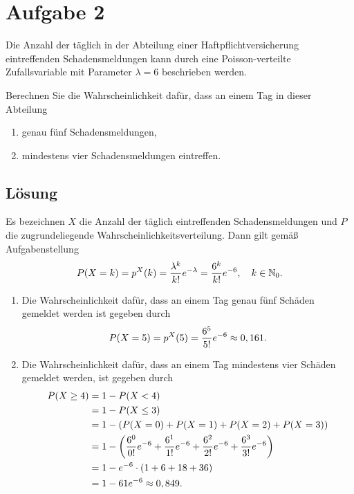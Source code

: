\documentclass{exercise}
\begin{document}
    \section*{Aufgabe 2}

    \begin{problem}
        Die Anzahl der täglich in der Abteilung einer Haftpflichtversicherung eintreffenden Schadensmeldungen kann durch eine Poisson-verteilte Zufallsvariable mit Parameter \(\lambda = 6\) beschrieben werden.

        Berechnen Sie die Wahrscheinlichkeit dafür, dass an einem Tag in dieser Abteilung
        \begin{enumerate}
            \item genau fünf Schadensmeldungen,
            \item mindestens vier Schadensmeldungen eintreffen.
        \end{enumerate}
    \end{problem}

    \subsection*{Lösung}
    Es bezeichnen \(X\) die Anzahl der täglich eintreffenden Schadensmeldungen und \(P\) die zugrundeliegende Wahrscheinlichkeitsverteilung.
    Dann gilt gemäß Aufgabenstellung
    \[
        P\parentheses*{X = k} = p^X\parentheses*{k} = \frac{\lambda^k}{k!}e^{-\lambda} = \frac{6^k}{k!}e^{-6}, \quad k \in \N_0.
    \]
    \begin{enumerate}
        \item Die Wahrscheinlichkeit dafür, dass an einem Tag genau fünf Schäden gemeldet werden ist gegeben durch
        \[
            P\parentheses*{X = 5} = p^X\parentheses*{5} = \frac{6^5}{5!}e^{-6} \approx 0,161.
        \]
        \item Die Wahrscheinlichkeit dafür, dass an einem Tag mindestens vier Schäden gemeldet werden, ist gegeben durch
        \begin{align*}
            P\parentheses*{X \ge 4} &= 1 - P\parentheses*{X < 4}\\
            &= 1 - P\parentheses*{X \le 3}\\
            &= 1 - \parentheses*{P\parentheses*{X = 0} + P\parentheses*{X = 1} + P\parentheses*{X = 2} + P\parentheses*{X = 3}}\\
            &= 1 - \parentheses*{\frac{6^0}{0!}e^{-6} + \frac{6^1}{1!}e^{-6} + \frac{6^2}{2!}e^{-6} + \frac{6^3}{3!}e^{-6}}\\
            &= 1 - e^{-6} \cdot \parentheses*{1 + 6 + 18 + 36}\\
            &= 1- 61e^{-6} \approx 0,849.
        \end{align*}
    \end{enumerate}
\end{document}
